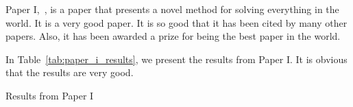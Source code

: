 Paper I,~, is a paper that presents a novel method for
solving everything in the world.
It is a very good paper.
It is so good that it has been cited by many other papers.
Also, it has been awarded a prize for being the best paper in the world.

In Table~\ref{tab:paper_i_results}, we present the results from Paper I.
It is obvious that the results are very good.

\begin{table}[h]
    \centering
    \caption{Results from Paper I}
    \label{tab:paper_i_results}
    
\end{table}
